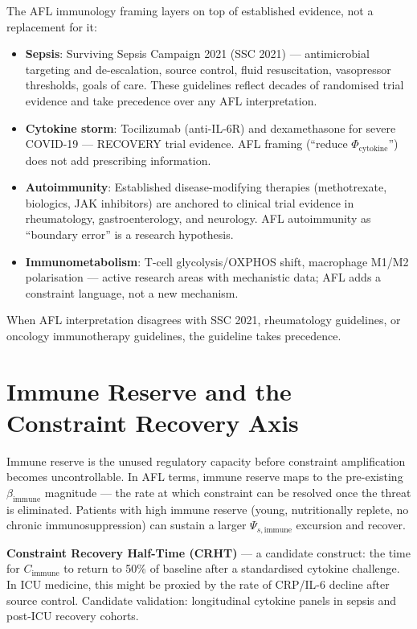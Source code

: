 \documentclass[12pt,a4paper]{article}
\begin{document}
The AFL immunology framing layers on top of established evidence, not a replacement for it:
\begin{itemize}
    \item \textbf{Sepsis}: Surviving Sepsis Campaign 2021 (SSC 2021) — antimicrobial targeting and de-escalation, source control, fluid resuscitation, vasopressor thresholds, goals of care. These guidelines reflect decades of randomised trial evidence and take precedence over any AFL interpretation.
    \item \textbf{Cytokine storm}: Tocilizumab (anti-IL-6R) and dexamethasone for severe COVID-19 — RECOVERY trial evidence. AFL framing (``reduce $\Phi_{\mathrm{cytokine}}$'') does not add prescribing information.
    \item \textbf{Autoimmunity}: Established disease-modifying therapies (methotrexate, biologics, JAK inhibitors) are anchored to clinical trial evidence in rheumatology, gastroenterology, and neurology. AFL autoimmunity as ``boundary error'' is a research hypothesis.
    \item \textbf{Immunometabolism}: T-cell glycolysis/OXPHOS shift, macrophage M1/M2 polarisation — active research areas with mechanistic data; AFL adds a constraint language, not a new mechanism.
\end{itemize}

When AFL interpretation disagrees with SSC 2021, rheumatology guidelines, or oncology immunotherapy guidelines, the guideline takes precedence.

\section{Immune Reserve and the Constraint Recovery Axis}

Immune reserve is the unused regulatory capacity before constraint amplification becomes uncontrollable. In AFL terms, immune reserve maps to the pre-existing $\beta_{\mathrm{immune}}$ magnitude — the rate at which constraint can be resolved once the threat is eliminated. Patients with high immune reserve (young, nutritionally replete, no chronic immunosuppression) can sustain a larger $\Psi_{s,\mathrm{immune}}$ excursion and recover.

\textbf{Constraint Recovery Half-Time (CRHT)} — a candidate construct: the time for $C_{\mathrm{immune}}$ to return to 50\% of baseline after a standardised cytokine challenge. In ICU medicine, this might be proxied by the rate of CRP/IL-6 decline after source control. Candidate validation: longitudinal cytokine panels in sepsis and post-ICU recovery cohorts.
\end{document}
